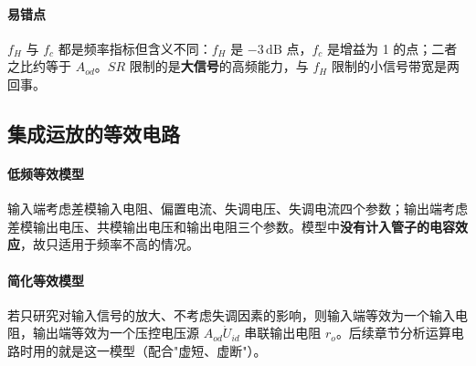 \paragraph{易错点}
$f_H$ 与 $f_c$ 都是频率指标但含义不同：$f_H$ 是 $-3\,\text{dB}$ 点，$f_c$ 是增益为 1 的点；二者之比约等于 $A_{od}$。$SR$ 限制的是\textbf{大信号}的高频能力，与 $f_H$ 限制的小信号带宽是两回事。

\subsection{集成运放的等效电路}

\paragraph{低频等效模型}
输入端考虑差模输入电阻、偏置电流、失调电压、失调电流四个参数；输出端考虑差模输出电压、共模输出电压和输出电阻三个参数。模型中\textbf{没有计入管子的电容效应}，故只适用于频率不高的情况。

\paragraph{简化等效模型}
若只研究对输入信号的放大、不考虑失调因素的影响，则输入端等效为一个输入电阻，输出端等效为一个压控电压源 $A_{od}\dot U_{id}$ 串联输出电阻 $r_o$。后续章节分析运算电路时用的就是这一模型（配合"虚短、虚断"）。
